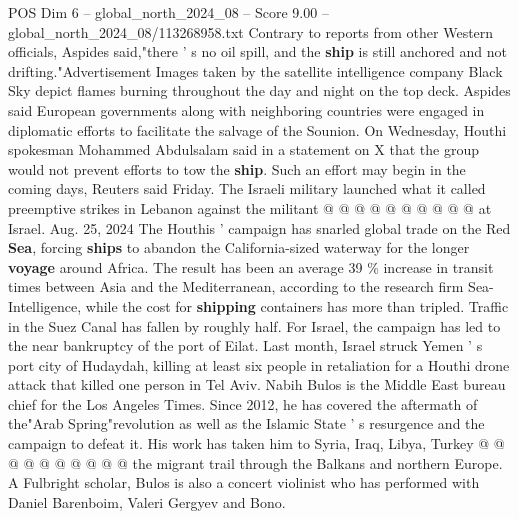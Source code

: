 \begin{textsample}{POS Dim 6 – global\_north\_2024\_08 – Score 9.00 – global\_north\_2024\_08/113268958.txt}
Contrary to reports from other Western officials, Aspides said,"there ' s no oil spill, and the \textbf{ship} is still anchored and not drifting."Advertisement Images taken by the satellite intelligence company Black Sky depict flames burning throughout the day and night on the top deck.
Aspides said European governments along with neighboring countries were engaged in diplomatic efforts to facilitate the salvage of the Sounion.
On Wednesday, Houthi spokesman Mohammed Abdulsalam said in a statement on X that the group would not prevent efforts to tow the \textbf{ship}.
Such an effort may begin in the coming days, Reuters said Friday.
The Israeli military launched what it called preemptive strikes in Lebanon against the militant @ @ @ @ @ @ @ @ @ @ at Israel.
Aug. 25, 2024 The Houthis ' campaign has snarled global trade on the Red \textbf{Sea}, forcing \textbf{ships} to abandon the California-sized waterway for the longer \textbf{voyage} around Africa.
The result has been an average 39 \% increase in transit times between Asia and the Mediterranean, according to the research firm Sea-Intelligence, while the cost for \textbf{shipping} containers has more than tripled.
Traffic in the Suez Canal has fallen by roughly half.
For Israel, the campaign has led to the near bankruptcy of the port of Eilat.
Last month, Israel struck Yemen ' s port city of Hudaydah, killing at least six people in retaliation for a Houthi drone attack that killed one person in Tel Aviv.
Nabih Bulos is the Middle East bureau chief for the Los Angeles Times.
Since 2012, he has covered the aftermath of the"Arab Spring"revolution as well as the Islamic State ' s resurgence and the campaign to defeat it.
His work has taken him to Syria, Iraq, Libya, Turkey @ @ @ @ @ @ @ @ @ @ the migrant trail through the Balkans and northern Europe.
A Fulbright scholar, Bulos is also a concert violinist who has performed with Daniel Barenboim, Valeri Gergyev and Bono.

\end{textsample}
